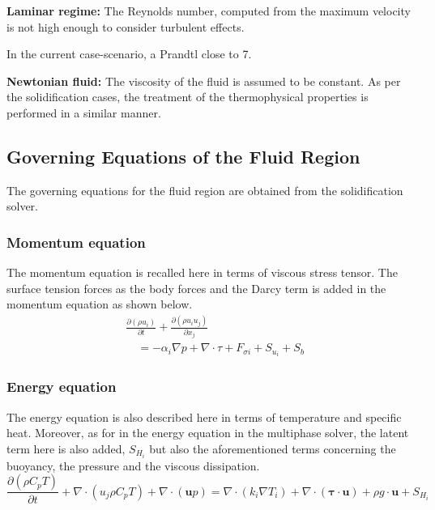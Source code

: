 \textbf{Laminar regime:} The Reynolds number, computed from the maximum velocity is not high enough to consider turbulent effects. 

In the current case-scenario, a Prandtl close to 7.

\textbf{Newtonian fluid:} The viscosity of the fluid is assumed to be constant.
As per the solidification cases, the treatment of the thermophysical properties is performed in a similar manner.

\subsection{Governing Equations of the Fluid Region}
The governing equations for the fluid region are obtained from the solidification solver. 

\subsubsection*{Momentum equation}

\setlength{\parindent}{0.5cm} The momentum equation is recalled here in terms of viscous stress tensor. The surface tension forces as the body forces and the Darcy term is added in the momentum equation as shown below.
\begin{equation}
	\label{4.4}
	\begin{aligned}
	&\frac{\partial\left(\rho {u}_{i}\right)}{\partial t}+\frac{\partial\left(\rho {u}_{i} {u}_{j}\right)}{\partial x_{j}} \\
	&\quad=-\alpha_{i} \nabla p+\nabla \cdot \tau +F_{\sigma i}+S_{u_{i}}+S_{b}
	\end{aligned}
\end{equation}
\subsubsection*{Energy equation}

\setlength{\parindent}{0.5cm} The energy equation is also described here in terms of temperature and specific heat. Moreover, as for in the energy equation in the multiphase solver, the latent term here is also added, $S_{H_{i}}$ but also the aforementioned terms concerning the buoyancy, the pressure and the viscous dissipation.
\begin{equation}
	\label{4.5}
	\frac{\partial (\rho C_{p} T)}{\partial t}+\nabla \cdot\left(u_{j}\rho C_{p} T\right) + \nabla \cdot (\textbf{u}p)=\nabla \cdot\left(k_{i} \nabla T_{i}\right) + \nabla \cdot (\boldsymbol{\tau}\cdot\textbf{u})+\rho g \cdot \textbf{u} + S_{H_{i}}
\end{equation}

